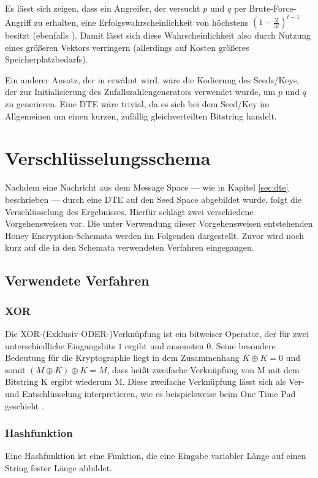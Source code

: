 Es lässt sich zeigen, dass ein Angreifer, der versucht \(p\) und \(q\) per Brute-Force-Angriff zu erhalten, eine Erfolgswahrscheinlichkeit von höchstens \((1-\frac{2}{3l})^{t-1}\) besitzt (ebenfalls \cite{EURO2014}). Damit lässt sich diese Wahrscheinlichkeit also durch Nutzung eines größeren Vektors verringern (allerdings auf Kosten größeres Speicherplatzbedarfs).

Ein anderer Ansatz, der in \cite{EURO2014} erwähnt wird, wäre die Kodierung des Seeds/Keys, der zur Initialisierung des Zufallszahlengenerators verwendet wurde, um \(p\) und \(q\) zu generieren. Eine DTE wäre trivial, da es sich bei dem Seed/Key im Allgemeinen um einen kurzen, zufällig gleichverteilten Bitstring handelt. 

\section{Verschlüsselungsschema}
\label{sec:schema}

Nachdem eine Nachricht aus dem Message Space --- wie in Kapitel \ref{sec:dte} beschrieben --- durch eine DTE auf den Seed Space abgebildet wurde, folgt die Verschlüsselung des Ergebnisses. Hierfür schlägt \cite{EURO2014} zwei verschiedene Vorgehensweisen vor. Die unter Verwendung dieser Vorgehensweisen entstehenden Honey Encryption-Schemata werden im Folgenden dargestellt. Zuvor wird noch kurz auf die in den Schemata verwendeten Verfahren eingegangen.

\subsection{Verwendete Verfahren}

\subsubsection*{XOR}
Die XOR-(Exklusiv-ODER-)Verknüpfung ist ein bitweiser Operator, der für zwei unterschiedliche Eingangsbits $1$ ergibt und ansonsten $0$. Seine besondere Bedeutung für die Kryptographie liegt in dem Zusammenhang \(K \oplus K = 0\) und somit \((M \oplus K) \oplus K = M\), dass heißt zweifache Verknüpfung von M mit dem Bitstring K ergibt wiederum M. Diese zweifache Verknüpfung lässt sich als Ver- und Entschlüsselung interpretieren, wie es beispielsweise beim One Time Pad geschieht \cite{Schneier2006}.%

\subsubsection*{Hashfunktion}
Eine Hashfunktion ist eine Funktion, die eine Eingabe variabler Länge auf einen String fester Länge abbildet.

